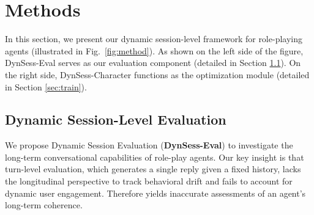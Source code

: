 

\section{Methods}





In this section, we present our dynamic session-level framework for role-playing agents (illustrated in Fig.~\ref{fig:method}). As shown on the left side of the figure, DynSess-Eval serves as our evaluation component (detailed in Section \ref{sec:eval}). On the right side, DynSess-Character functions as the optimization module (detailed in Section \ref{sec:train}).



\subsection{Dynamic Session-Level Evaluation}
\label{sec:eval}

We propose Dynamic Session Evaluation (\textbf{DynSess-Eval}) to investigate the long-term conversational capabilities of role-play agents. Our key insight is that turn-level evaluation, which generates a single reply given a fixed history, lacks the longitudinal perspective to track behavioral drift and fails to account for dynamic user engagement. Therefore yields inaccurate assessments of an agent's long-term coherence.

